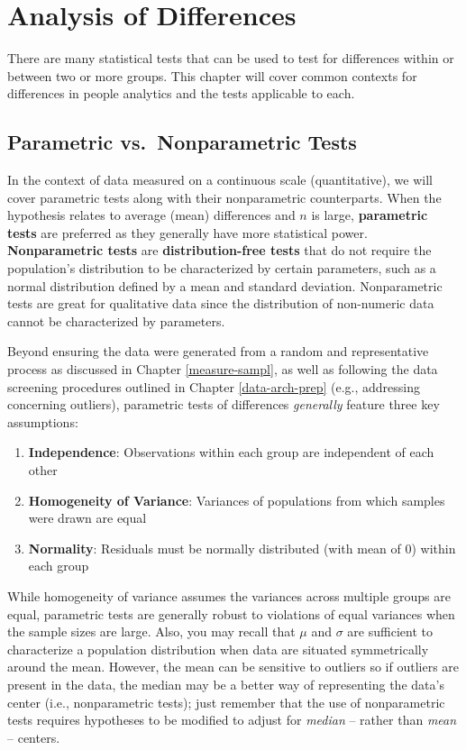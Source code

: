 \documentclass[
]{book}
\providecommand{\tightlist}{%
  \setlength{\itemsep}{0pt}\setlength{\parskip}{0pt}}
\begin{document}
\hypertarget{aod}{%
\chapter{Analysis of Differences}\label{aod}}

There are many statistical tests that can be used to test for differences within or between two or more groups. This chapter will cover common contexts for differences in people analytics and the tests applicable to each.

\hypertarget{parametric-vs.-nonparametric-tests}{%
\section{Parametric vs.~Nonparametric Tests}\label{parametric-vs.-nonparametric-tests}}

In the context of data measured on a continuous scale (quantitative), we will cover parametric tests along with their nonparametric counterparts. When the hypothesis relates to average (mean) differences and \(n\) is large, \textbf{parametric tests} are preferred as they generally have more statistical power. \textbf{Nonparametric tests} are \textbf{distribution-free tests} that do not require the population's distribution to be characterized by certain parameters, such as a normal distribution defined by a mean and standard deviation. Nonparametric tests are great for qualitative data since the distribution of non-numeric data cannot be characterized by parameters.

Beyond ensuring the data were generated from a random and representative process as discussed in Chapter \ref{measure-sampl}, as well as following the data screening procedures outlined in Chapter \ref{data-arch-prep} (e.g., addressing concerning outliers), parametric tests of differences \emph{generally} feature three key assumptions:

\begin{enumerate}
\def\labelenumi{\arabic{enumi}.}
\tightlist
\item
  \textbf{Independence}: Observations within each group are independent of each other
\item
  \textbf{Homogeneity of Variance}: Variances of populations from which samples were drawn are equal
\item
  \textbf{Normality}: Residuals must be normally distributed (with mean of 0) within each group
\end{enumerate}

While homogeneity of variance assumes the variances across multiple groups are equal, parametric tests are generally robust to violations of equal variances when the sample sizes are large. Also, you may recall that \(\mu\) and \(\sigma\) are sufficient to characterize a population distribution when data are situated symmetrically around the mean. However, the mean can be sensitive to outliers so if outliers are present in the data, the median may be a better way of representing the data's center (i.e., nonparametric tests); just remember that the use of nonparametric tests requires hypotheses to be modified to adjust for \emph{median} -- rather than \emph{mean} -- centers.
\end{document}
